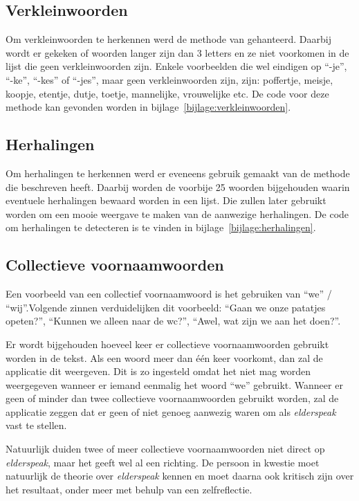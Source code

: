 \subsection{Verkleinwoorden}
Om verkleinwoorden te herkennen werd de methode van \textcite{Standaert2021} gehanteerd. Daarbij wordt er gekeken of woorden langer zijn dan 3 letters en ze niet voorkomen in de lijst die geen verkleinwoorden zijn. Enkele voorbeelden die wel eindigen op ``-je'', ``-ke'', ``-kes'' of ``-jes'', maar geen verkleinwoorden zijn, zijn: poffertje, meisje, koopje, etentje, dutje, toetje, mannelijke, vrouwelijke etc. De code voor deze methode kan gevonden worden in bijlage~\ref{bijlage:verkleinwoorden}.

\subsection{Herhalingen}
Om herhalingen te herkennen werd er eveneens gebruik gemaakt van de methode die \textcite{Standaert2021} beschreven heeft. Daarbij worden de voorbije 25 woorden bijgehouden waarin eventuele herhalingen bewaard worden in een lijst. Die zullen later gebruikt worden om een mooie weergave te maken van de aanwezige herhalingen.
De code om herhalingen te detecteren is te vinden in bijlage~\ref{bijlage:herhalingen}.

\subsection{Collectieve voornaamwoorden}
Een voorbeeld van een collectief voornaamwoord is het gebruiken van ``we'' / ``wij''.Volgende zinnen verduidelijken dit voorbeeld: ``Gaan we onze patatjes opeten?'', ``Kunnen we alleen naar de wc?'', ``Awel, wat zijn we aan het doen?''.

Er wordt bijgehouden hoeveel keer er collectieve voornaamwoorden gebruikt worden in de tekst. Als een woord meer dan één keer voorkomt, dan zal de applicatie dit weergeven. Dit is zo ingesteld omdat het niet mag worden weergegeven wanneer er iemand eenmalig het woord ``we'' gebruikt.
Wanneer er geen of minder dan twee collectieve voornaamwoorden gebruikt worden, zal de applicatie zeggen dat er geen of niet genoeg aanwezig waren om als \textit{elderspeak} vast te stellen.

Natuurlijk duiden twee of meer collectieve voornaamwoorden niet direct op \textit{elderspeak}, maar het geeft wel al een richting. De persoon in kwestie moet natuurlijk de theorie over \textit{elderspeak} kennen en moet daarna ook kritisch zijn over het resultaat, onder meer met behulp van een zelfreflectie.


